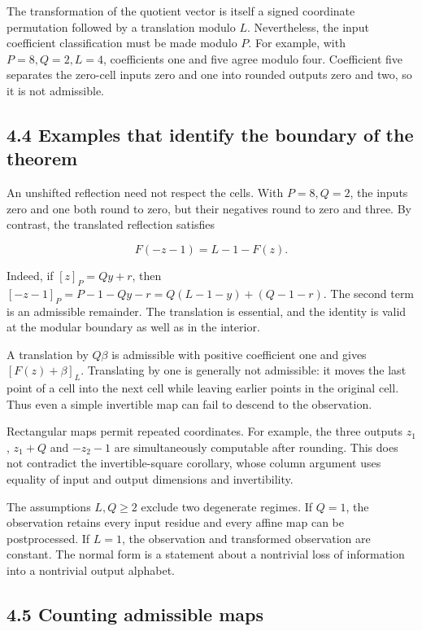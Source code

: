 \documentclass[
]{article}
\begin{document}
The transformation of the quotient vector is itself a signed coordinate
permutation followed by a translation modulo \(L\). Nevertheless, the
input coefficient classification must be made modulo \(P\). For example,
with \(P=8,Q=2,L=4\), coefficients one and five agree modulo four.
Coefficient five separates the zero-cell inputs zero and one into
rounded outputs zero and two, so it is not admissible.

\subsection{4.4 Examples that identify the boundary of the
theorem}\label{examples-that-identify-the-boundary-of-the-theorem}

An unshifted reflection need not respect the cells. With \(P=8,Q=2\),
the inputs zero and one both round to zero, but their negatives round to
zero and three. By contrast, the translated reflection satisfies

\[
F(-z-1)=L-1-F(z).
\]

Indeed, if \([z]_P=Qy+r\), then \([-z-1]_P=P-1-Qy-r=Q(L-1-y)+(Q-1-r)\).
The second term is an admissible remainder. The translation is
essential, and the identity is valid at the modular boundary as well as
in the interior.

A translation by \(Q\beta\) is admissible with positive coefficient one
and gives \([F(z)+\beta]_L\). Translating by one is generally not
admissible: it moves the last point of a cell into the next cell while
leaving earlier points in the original cell. Thus even a simple
invertible map can fail to descend to the observation.

Rectangular maps permit repeated coordinates. For example, the three
outputs \(z_1\), \(z_1+Q\) and \(-z_2-1\) are simultaneously computable
after rounding. This does not contradict the invertible-square
corollary, whose column argument uses equality of input and output
dimensions and invertibility.

The assumptions \(L,Q\ge2\) exclude two degenerate regimes. If \(Q=1\),
the observation retains every input residue and every affine map can be
postprocessed. If \(L=1\), the observation and transformed observation
are constant. The normal form is a statement about a nontrivial loss of
information into a nontrivial output alphabet.

\subsection{4.5 Counting admissible
maps}\label{counting-admissible-maps}
\end{document}
